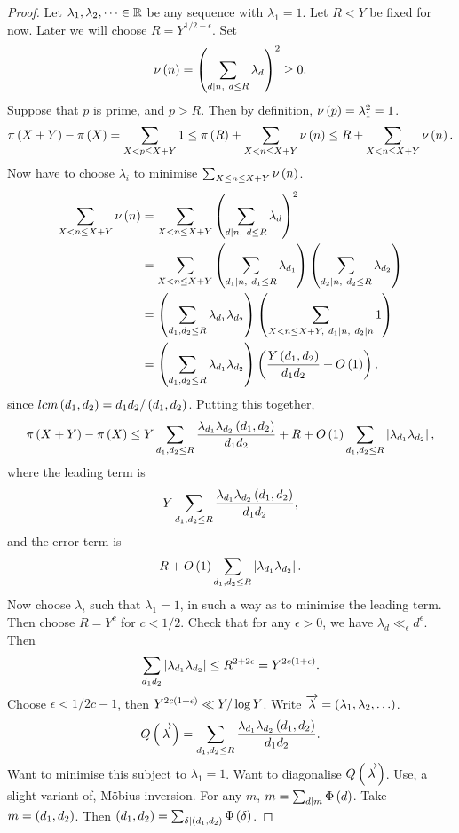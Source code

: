\begin{proof}
Let $ \lambda_1, \lambda_2, \dots \in \mathbb{R} $ be any sequence with $ \lambda_1 = 1 $. Let $ R < Y $ be fixed for now. Later we will choose $ R = Y^{1 / 2 - \epsilon} $. Set
$$ \nu\left( n \right) = \left( \sum_{d \mid n, \ d \le R} \lambda_d \right)^2 \ge 0. $$
Suppose that $ p $ is prime, and $ p > R $. Then by definition, $ \nu\left( p \right) = \lambda_1^2 = 1 $.
$$ \pi\left( X + Y \right) - \pi\left( X \right) = \sum_{X < p \le X + Y} 1 \le \pi\left( R \right) + \sum_{X < n \le X + Y} \nu\left( n \right) \le R + \sum_{X < n \le X + Y} \nu\left( n \right). $$
Now have to choose $ \lambda_i $ to minimise $ \sum_{X \le n \le X + Y} \nu\left( n \right) $.
\begin{align*}
\sum_{X < n \le X + Y} \nu\left( n \right)
& = \sum_{X < n \le X + Y} \left( \sum_{d \mid n, \ d \le R} \lambda_d \right)^2 \\
& = \sum_{X < n \le X + Y} \left( \sum_{d_1 \mid n, \ d_1 \le R} \lambda_{d_1} \right)\left( \sum_{d_2 \mid n, \ d_2 \le R} \lambda_{d_2} \right) \\
& = \left( \sum_{d_1, d_2 \le R} \lambda_{d_1}\lambda_{d_2} \right)\left( \sum_{X < n \le X + Y, \ d_1 \mid n, \ d_2 \mid n} 1 \right) \\
& = \left( \sum_{d_1, d_2 \le R} \lambda_{d_1}\lambda_{d_2} \right)\left( \dfrac{Y\left( d_1, d_2 \right)}{d_1d_2} + O\left( 1 \right) \right),
\end{align*}
since $ lcm\left( d_1, d_2 \right) = d_1d_2 / \left( d_1, d_2 \right) $. Putting this together,
$$ \pi\left( X + Y \right) - \pi\left( X \right) \le Y\sum_{d_1, d_2 \le R} \dfrac{\lambda_{d_1}\lambda_{d_2}\left( d_1, d_2 \right)}{d_1d_2} + R + O\left( 1 \right)\sum_{d_1, d_2 \le R} \left\lvert \lambda_{d_1}\lambda_{d_2} \right\rvert, $$
where the leading term is
$$ Y\sum_{d_1, d_2 \le R} \dfrac{\lambda_{d_1}\lambda_{d_2}\left( d_1, d_2 \right)}{d_1d_2}, $$
and the error term is
$$ R + O\left( 1 \right)\sum_{d_1, d_2 \le R} \left\lvert \lambda_{d_1}\lambda_{d_2} \right\rvert. $$
Now choose $ \lambda_i $ such that $ \lambda_1 = 1 $, in such a way as to minimise the leading term. Then choose $ R = Y^c $ for $ c < 1 / 2 $. Check that for any $ \epsilon > 0 $, we have $ \lambda_d \ll_\epsilon d^\epsilon $. Then
$$ \sum_{d_1d_2} \left\lvert \lambda_{d_1}\lambda_{d_2} \right\rvert \le R^{2 + 2\epsilon} = Y^{2c\left( 1 + \epsilon \right)}. $$
Choose $ \epsilon < 1 / 2c - 1 $, then $ Y^{2c\left( 1 + \epsilon \right)} \ll Y / \log Y $. Write $ \overrightarrow{\lambda} = \rb{\lambda_1, \lambda_2, \dots} $.
$$ Q\left( \overrightarrow{\lambda} \right) = \sum_{d_1, d_2 \le R} \dfrac{\lambda_{d_1}\lambda_{d_2}\left( d_1, d_2 \right)}{d_1d_2}. $$
Want to minimise this subject to $ \lambda_1 = 1 $. Want to diagonalise $ Q\left( \overrightarrow{\lambda} \right) $. Use, a slight variant of, M\"obius inversion. For any $ m $, $ m = \sum_{d \mid m} \Phi\left( d \right) $. Take $ m = \left( d_1, d_2 \right) $. Then $ \left( d_1, d_2 \right) = \sum_{\delta \mid \left( d_1, d_2 \right)} \Phi\left( \delta \right) $.

\end{proof}
